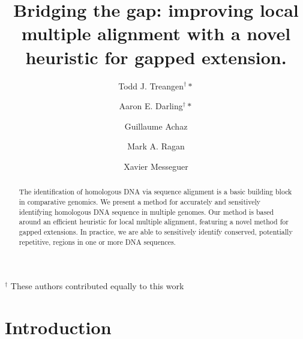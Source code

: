 \documentclass{ws-procs9x6}
\begin{document}
\title{Bridging the gap: improving local multiple alignment with a novel heuristic for gapped extension.}

\author{Todd J. Treangen$^\dag*$}

\address{Dept. of Computer Science, Technical Univ. of Catalonia\\
Barcelona, Spain\\
$^*$E-mail: treangen@lsi.upc.edu}

\author{Aaron E. Darling$^\dag*$}

\address{Institute for Molecular Bioscience, Univ. of Queensland\\
Brisbane, Australia\\
$^*$E-mail: a.darling@imb.uq.edu.au}


\author{Guillaume Achaz}

\address{Atelier de Bioinformatique, Univ. Pierre et Marie Curie-Paris 6\\
Paris, France}

\author{ Mark A. Ragan}

\address{Institute for Molecular Bioscience, Univ. of Queensland\\
Brisbane, Australia\\
}

\author{ Xavier Messeguer}

\address{Dept. of Computer Science, Technical Univ. of Catalonia\\
Barcelona, Spain\\
}

{\center \scriptsize $^\dag$ These authors contributed equally to this work \\}

\begin{abstract}
The identification of homologous DNA via sequence alignment is a basic building block in comparative genomics.  We present a method for accurately and sensitively identifying homologous DNA sequence in multiple genomes. Our method is based around an efficient heuristic for local multiple alignment, featuring a novel method for gapped extensions. In practice, we are able to sensitively identify conserved, potentially repetitive, regions in one or more DNA sequences.
\end{abstract}



\bodymatter

\section{Introduction}
\end{document}
